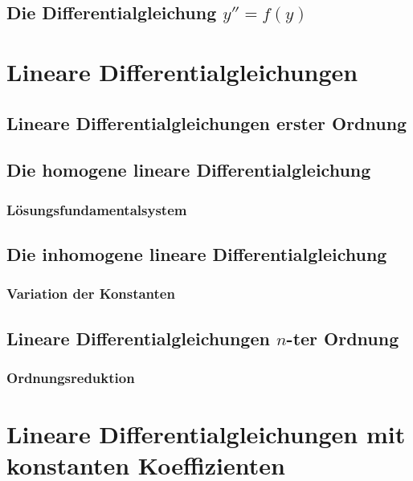 \documentclass[a4paper, 11pt, accentcolor = tud3b]{tudreport}
\begin{document}
		\section{Die Differentialgleichung \( y'' = f(y) \)} %

	\chapter{Lineare Differentialgleichungen} %

		\section{Lineare Differentialgleichungen erster Ordnung} %

		\section{Die homogene lineare Differentialgleichung} %

			\subsection{Lösungsfundamentalsystem} %

		\section{Die inhomogene lineare Differentialgleichung} %

			\subsection{Variation der Konstanten} %

		\section{Lineare Differentialgleichungen \(n\)-ter Ordnung} %

			\subsection{Ordnungsreduktion} %

	\chapter{Lineare Differentialgleichungen mit konstanten Koeffizienten} %
\end{document}
